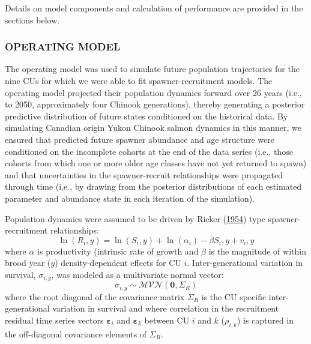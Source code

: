 \documentclass[11pt]{book}
\begin{document}
Details on model components and calculation of performance are provided in the sections below.

\hypertarget{operating-model}{%
\subsubsection{OPERATING MODEL}\label{operating-model}}

The operating model was used to simulate future population trajectories for the nine CUs for which we were able to fit spawner-recruitment models. The operating model projected their population dynamics forward over 26 years (i.e., to 2050, approximately four Chinook generations), thereby generating a posterior predictive distribution of future states conditioned on the historical data. By simulating Canadian origin Yukon Chinook salmon dynamics in this manner, we ensured that predicted future spawner abundance and age structure were conditioned on the incomplete cohorts at the end of the data series (i.e., those cohorts from which one or more older age classes have not yet returned to spawn) and that uncertainties in the spawner-recruit relationships were propagated through time (i.e., by drawing from the posterior distributions of each estimated parameter and abundance state in each iteration of the simulation).

Population dynamics were assumed to be driven by Ricker (\protect\hyperlink{ref-ricker-1954}{1954}) type spawner-recruitment relationships: \begin{equation}
  \ln(R_i,y) = \ln(S_i,y) + \ln(\alpha_i) - \beta S_i,y + v_i,y
  \label{eq:AR1-ricker-main}
\end{equation}
where \(\alpha\) is productivity (intrinsic rate of growth and \(\beta\) is the magnitude of within brood year (\(y\)) density-dependent effects for CU \(i\). Inter-generational variation in survival, \(\sigma_{i,y}\), was modeled as a multivariate normal vector:
\begin{equation}
  \sigma_{i,y} \sim \mathcal{MVN}\left(\mathbf{0}, \Sigma_R\right)
  \label{eq:var-covar}
\end{equation}
where the root diagonal of the covariance matrix \(\Sigma_R\) is the CU specific inter-generational variation in survival and where correlation in the recruitment residual time series vectors \(\boldsymbol{\varepsilon}_i\) and \(\boldsymbol{\varepsilon}_k\) between CU \(i\) and \(k\) (\(\rho_{i,k}\)) is captured in the off-diagonal covariance elements of \(\Sigma_R\).
\end{document}
